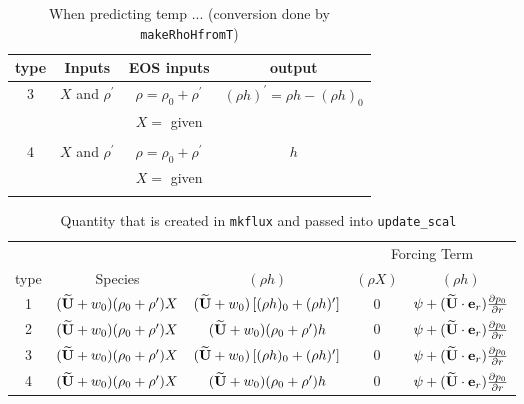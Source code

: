 \begin{table*}
\begin{center}
\caption{When predicting temp ... (conversion done by {\tt makeRhoHfromT}) \newline}
\begin{tabular}{c|c|c|c}
\hline
\hline
{type} & {Inputs } & {EOS inputs} & {output} \\
\hline
3 & $X$ and $\rho^\prime$ & $\rho = \rho_0 + \rho^\prime$ &  $(\rho h)^\prime = \rho h - (\rho h)_0$ \\
   &                   & $   X = $ given & \\
   &                   &                 & \\
 4 & $X$ and $\rho^\prime$ & $\rho = \rho_0 + \rho^\prime$ & $h$ \\
   &                   & $   X = $ given & \\
   &                   &                 & \\
\hline
\end{tabular}
\end{center}
\end{table*}



\begin{table*}
\begin{center}
\caption{Quantity that is created in {\tt mkflux} and passed into {\tt update\_scal}\newline\
}
\begin{tabular}{c|c|c|c|c}
       &            &              &\multicolumn{2}{c}{Forcing Term} \\
{type} & {Species } & {$(\rho h)$} & {$(\rho X)$} & {$(\rho h)$} \\
\hline 
1 & $(\widetilde{{\bf U}}+w_0)(\rho_0+\rho^\prime) X          $ & $(\widetilde{{\bf U}}+w_0)\left [(\rho h)_0 + (\rho h)^\prime\right]$ & 0 & $ \psi + (\widetilde{{\bf U}} \cdot \mathbf{e}_r) \frac{\partial p_0}{\partial r} $ \\[2mm]
2 & $(\widetilde{{\bf U}}+w_0)(\rho_0+\rho^\prime) X          $ & $(\widetilde{{\bf U}}+w_0) (\rho_0+\rho^\prime) h$ & 0 & $ \psi + (\widetilde{{\bf U}} \cdot \mathbf{e}_r) \frac{\partial p_0}{\partial r} $ \\[2mm]
3 & $(\widetilde{{\bf U}}+w_0)(\rho_0+\rho^\prime) X          $ & $(\widetilde{{\bf U}}+w_0)\left [(\rho h)_0 + (\rho h)^\prime\right]$ & 0 & $ \psi + (\widetilde{{\bf U}} \cdot \mathbf{e}_r) \frac{\partial p_0}{\partial r}$ \\[2mm]
4 & $(\widetilde{{\bf U}}+w_0)(\rho_0+\rho^\prime) X          $ & $(\widetilde{{\bf U}}+w_0) (\rho_0+\rho^\prime) h$ & 0 & $ \psi + (\widetilde{{\bf U}} \cdot \mathbf{e}_r) \frac{\partial p_0}{\partial r} $ \\[2mm]
\hline
\end{tabular}
\end{center}
\end{table*}



